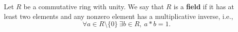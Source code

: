 \begin{definition}
  Let $R$ be a commutative ring with unity.
  We say that $R$ is a \textbf{field} if it has at least two elements and any
  nonzero element has a multiplicative inverse, i.e.,
  \begin{equation}
    \forall a \in R \setminus \{0\}\ \exists b \in R,\ a * b = 1.
  \end{equation}
\end{definition}
